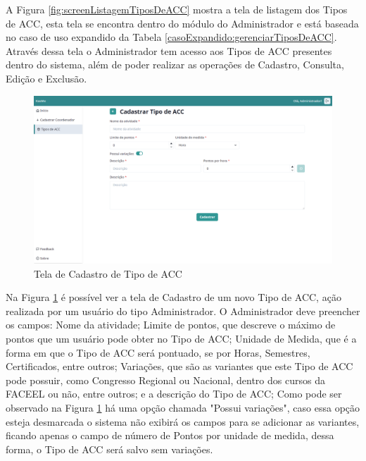 A Figura \ref{fig:screenListagemTiposDeACC} mostra a tela de listagem dos Tipos de ACC, esta tela se encontra dentro do módulo do Administrador e está baseada no caso de uso expandido da Tabela \ref{casoExpandido:gerenciarTiposDeACC}. Através dessa tela o Administrador tem acesso aos Tipos de ACC presentes dentro do sistema, além de poder realizar as operações de Cadastro, Consulta, Edição e Exclusão.

\begin{figure}[H]
    \centering
    \includegraphics[width=\textwidth]{dados/figuras/Proposta/Screens/admin_create_acc_type.png}
    \caption{Tela de Cadastro de Tipo de ACC}
    \label{fig:screenCadastroTipoDeACC}
\end{figure}

Na Figura \ref{fig:screenCadastroTipoDeACC} é possível ver a tela de Cadastro de um novo Tipo de ACC, ação realizada por um usuário do tipo Administrador. O Administrador deve preencher os campos: Nome da atividade; Limite de pontos, que descreve o máximo de pontos que um usuário pode obter no Tipo de ACC; Unidade de Medida, que é a forma em que o Tipo de ACC será pontuado, se por Horas, Semestres, Certificados, entre outros; Variações, que são as variantes que este Tipo de ACC pode possuir, como Congresso Regional ou Nacional, dentro dos cursos da FACEEL ou não, entre outros; e a descrição do Tipo de ACC; Como pode ser observado na Figura \ref{fig:screenCadastroTipoDeACC} há uma opção chamada "Possui variações", caso essa opção esteja desmarcada o sistema não exibirá os campos para se adicionar as variantes, ficando apenas o campo de número de Pontos por unidade de medida, dessa forma, o Tipo de ACC será salvo sem variações.

